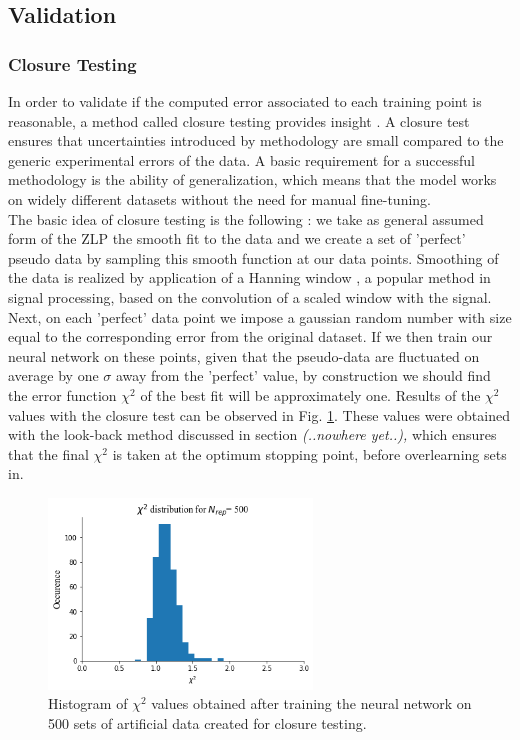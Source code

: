 \subsection{Validation}

\subsubsection*{Closure Testing}
In order to validate if the computed error associated to each training point is reasonable, a method called closure testing provides insight \cite{Ball:2015oha}. A closure test ensures that uncertainties introduced by methodology are small compared to the generic experimental errors of the data. A basic requirement for a successful methodology is the ability of generalization, which means that the model works on widely different datasets without the need for manual fine-tuning.\\
The basic idea of closure testing is the following \cite{Ball:2015oha}: we take as general assumed form of the ZLP the smooth fit to the data and we create a set of 'perfect' pseudo data by sampling this smooth function at our data points. Smoothing of the data is realized by application of a Hanning window \cite{Essenwanger:1986}, a popular method in signal processing, based on the convolution of a scaled window with the signal. \\
Next, on each 'perfect' data point we impose a gaussian random number with size equal to the corresponding error from the original dataset. If we then train our neural network on these points, given that the pseudo-data are fluctuated on average by one $\sigma$ away from the 'perfect' value, by construction we should find the error function $\chi^2$ of the best fit will be approximately one. Results of the $\chi^2$ values with the closure test can be observed in Fig. \ref{closure1}. These values were obtained with the look-back method discussed in section \textit{ (..nowhere yet..),} which ensures that the final $\chi^2$ is taken at the optimum stopping point, before overlearning sets in.

\begin{figure}[H]
    \centering
    \includegraphics[width=70mm]{plots/chi2.png}
    \caption{Histogram of $\chi^2$ values obtained after training the neural network on 500 sets of artificial data created for closure testing.}
    \label{closure1}
\end{figure}

